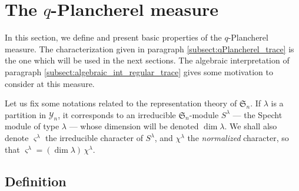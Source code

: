 \documentclass[10pt]{amsart}
\theoremstyle{remark}
\newcommand{\sym}{\mathfrak{S}}
\newcommand{\young}{\mathscr{Y}}
\begin{document}
\section{The $q$-Plancherel measure}\label{sect:def_q-planch}

In this section, we define and present basic properties of the $q$-Plancherel measure. The characterization given in paragraph \ref{subsect:qPlancherel_trace} is the one which will be used in the next sections. The algebraic interpretation of paragraph \ref{subsect:algebraic_int_regular_trace} gives some motivation to consider at this measure.\bigskip

Let us fix some notations related to the representation theory of $\sym_{n}$. If $\lambda$ is a partition in $\young_{n}$, it corresponds to an irreducible $\sym_{n}$-module $S^{\lambda}$ --- the Specht module of type $\lambda$ --- whose dimension will be denoted $\dim \lambda$. We shall also denote $\varsigma^{\lambda}$ the irreducible character of $S^{\lambda}$, and $\chi^{\lambda}$ the \emph{normalized} character, so that $\varsigma^{\lambda}=(\dim \lambda)\,\chi^{\lambda}$.\bigskip


\subsection{Definition}
\end{document}
